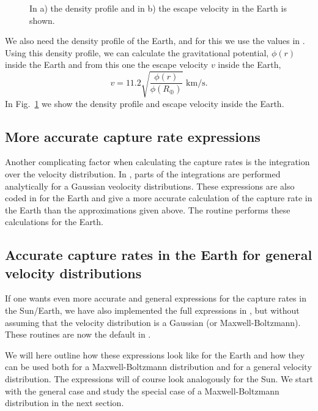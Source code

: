 \begin{figure}
\centerline{}
\caption{In a) the density profile and in b) the escape velocity in the Earth is shown.}
\label{fig:eadensvesc}
\end{figure}

We also need the density profile of the Earth, and for this we use the
values in \cite{EncBrit}. Using this density profile, we can calculate
the gravitational potential, $\phi(r)$ inside the Earth and from this
one the escape velocity $v$ inside the Earth,
\begin{equation}
   \label{eq:vesc}
   v = 11.2 \sqrt{\frac{\phi(r)}{\phi(R_\oplus)}} \mbox{~km/s.}
\end{equation}
In Fig.~\ref{fig:eadensvesc} we show the density profile and escape
velocity inside the Earth. 

\subsection{More accurate capture rate expressions}

Another complicating factor when calculating the capture rates is the
integration over the velocity 
distribution. In \cite{Gould:1987ir}, parts of the integrations are
performed analytically for a Gaussian veolocity distributions. These
expressions are also coded in \ds for the Earth and give a more
accurate calculation of the capture rate in the Earth than the
approximations given above. The routine  performs
these calculations for the Earth.

\subsection{Accurate capture rates in the Earth for general velocity distributions}


If one wants even more accurate and general expressions for the
capture rates in the Sun/Earth, we have also implemented the full
expressions in \cite{Gould:1987ir}, but without assuming that the velocity
distribution is a Gaussian (or Maxwell-Boltzmann). These routines are
now the default in \ds.

We will here outline how these expressions look
like for the Earth and how they can be used both for a Maxwell-Boltzmann
distribution and for a general velocity distribution. The expressions
will of course look analogously for the Sun. We start with
the general case and study the special case of a Maxwell-Boltzmann
distribution in the next section. 

